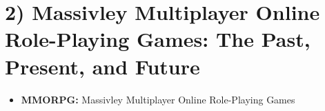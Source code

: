 \chapter*{2) Massivley Multiplayer Online Role-Playing Games: The Past, Present, and Future}

  \begin{itemize}
    \item {\bf MMORPG:} Massivley Multiplayer Online Role-Playing Games
  \end{itemize}